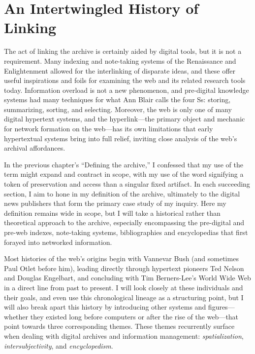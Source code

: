 \chapter{An Intertwingled History of Linking}

The act of linking the archive is certainly aided by digital tools, but it is not a requirement. Many indexing and note-taking systems of the Renaissance and Enlightenment allowed for the interlinking of disparate ideas, and these offer useful inspirations and foils for examining the web and its related research tools today. Information overload is not a new phenomenon, and pre-digital knowledge systems had many techniques for what Ann Blair calls the four Ss: storing, summarizing, sorting, and selecting.\autocite{blair_note_2004} Moreover, the web is only one of many digital hypertext systems, and the hyperlink---the primary object and mechanic for network formation on the web---has its own limitations that early hypertextual systems bring into full relief, inviting close analysis of the web's archival affordances.

In the previous chapter's ``Defining the archive,'' I confessed that my use of the term might expand and contract in scope, with my use of the word signifying a token of preservation and access than a singular fixed artifact. In each succeeding section, I aim to hone in my definition of the archive, ultimately to the digital news publishers that form the primary case study of my inquiry. Here my definition remains wide in scope, but I will take a historical rather than theoretical approach to the archive, especially encompassing the pre-digital and pre-web indexes, note-taking systems, bibliographies and encyclopedias that first forayed into networked information.

Most histories of the web's origins begin with Vannevar Bush (and sometimes Paul Otlet before him), leading directly through hypertext pioneers Ted Nelson and Douglas Engelbart, and concluding with Tim Berners-Lee's World Wide Web in a direct line from past to present. I will look closely at these individuals and their goals, and even use this chronological lineage as a structuring point, but I will also break apart this history by introducing other systems and figures---whether they existed long before computers or after the rise of the web---that point towards three corresponding themes. These themes recurrently surface when dealing with digital archives and information management: \emph{spatialization}, \emph{intersubjectivity}, and \emph{encyclopedism}.

